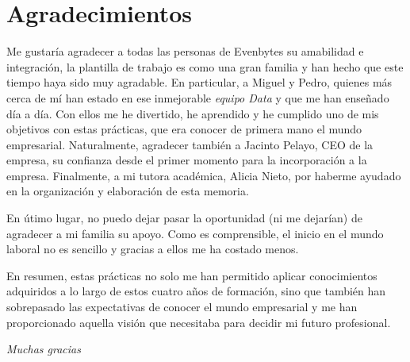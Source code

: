 \chapter*{Agradecimientos}
%
%
Me gustaría agradecer a todas las personas de Evenbytes su amabilidad e integración, la plantilla de trabajo es como una gran familia y han hecho que este tiempo haya sido muy agradable. En particular, a Miguel y Pedro, quienes más cerca de mí han estado en ese inmejorable \textit{equipo Data} y que me han enseñado día a día. Con ellos me he divertido, he aprendido y he cumplido uno de mis objetivos con estas prácticas, que era conocer de primera mano el mundo empresarial. Naturalmente, agradecer también a Jacinto Pelayo, CEO de la empresa, su confianza desde el primer momento para la incorporación a la empresa. Finalmente, a mi tutora académica, Alicia Nieto, por haberme ayudado en la organización y elaboración de esta memoria.

En útimo lugar, no puedo dejar pasar la oportunidad (ni me dejarían) de agradecer a mi familia su apoyo. Como es comprensible, el inicio en el mundo laboral no es sencillo y gracias a ellos me ha costado menos.

En resumen, estas prácticas no solo me han permitido aplicar conocimientos adquiridos a lo largo de estos cuatro años de formación, sino que también han sobrepasado las expectativas de conocer el mundo empresarial y me han proporcionado aquella visión que necesitaba para decidir mi futuro profesional.

\begin{flushright}
    \textit{Muchas gracias}
\end{flushright}